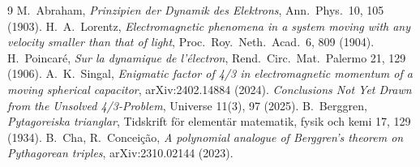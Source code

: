 \begin{thebibliography}{9}
 M.~Abraham, \emph{Prinzipien der Dynamik des Elektrons},
  Ann.\ Phys.\ 10, 105 (1903).
 H.~A.~Lorentz, \emph{Electromagnetic phenomena in a system
  moving with any velocity smaller than that of light}, Proc.\ Roy.\ Neth.\
  Acad.\ 6, 809 (1904).
 H.~Poincaré, \emph{Sur la dynamique de l'électron},
  Rend.\ Circ.\ Mat.\ Palermo 21, 129 (1906).
 A.~K.~Singal, \emph{Enigmatic factor of 4/3 in electromagnetic
  momentum of a moving spherical capacitor}, arXiv:2402.14884 (2024).
\bibitem{universe} \emph{Conclusions Not Yet Drawn from the Unsolved
  4/3-Problem}, Universe 11(3), 97 (2025).
 B.~Berggren, \emph{Pytagoreiska trianglar}, Tidskrift för
  elementär matematik, fysik och kemi 17, 129 (1934).
 B.~Cha, R.~Conceição, \emph{A polynomial analogue of Berggren's
  theorem on Pythagorean triples}, arXiv:2310.02144 (2023).
\end{thebibliography}
